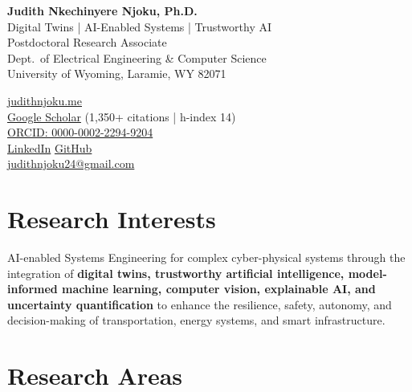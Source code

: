 \documentclass[11pt, letterpaper]{article}
\begin{document}
\nocite{*}
\thispagestyle{fancy}

\noindent
\begin{minipage}[t]{0.560\textwidth}
  {\LARGE\bfseries\color{uwred} Judith Nkechinyere Njoku, Ph.D.}\\[2pt]
  Digital Twins |  AI-Enabled Systems | Trustworthy AI\\
  Postdoctoral Research Associate\\
  Dept.\ of Electrical Engineering \& Computer Science\\
  University of Wyoming, Laramie, WY 82071
\end{minipage}%
\hfill
\begin{minipage}[t]{0.46\textwidth}
  \raggedleft

  \href{https://www.judithnjoku.me}{judithnjoku.me}\\
  \href{https://scholar.google.com/citations?user=Ag2gYzIAAAAJ}{Google Scholar} (1,350+ citations | h-index 14)\\
  \href{https://orcid.org/0000-0002-2294-9204}{ORCID: 0000-0002-2294-9204}\\
  \href{https://linkedin.com/in/judith989}{LinkedIn} \quad
  \href{https://github.com/Judith989}{GitHub} \\
  \href{mailto:judithnjoku24@gmail.com}{judithnjoku24@gmail.com}
\end{minipage}

\noindent{\color{uwred}\rule{\linewidth}{0.6pt}}


\section{Research Interests}

\noindent AI-enabled Systems Engineering for complex cyber-physical systems through the integration of \textbf{digital twins, trustworthy artificial intelligence, model-informed machine learning, computer vision, explainable AI, and uncertainty quantification} to enhance the resilience, safety, autonomy, and decision-making of transportation, energy systems, and smart infrastructure.

\section{Research Areas}
\end{document}
